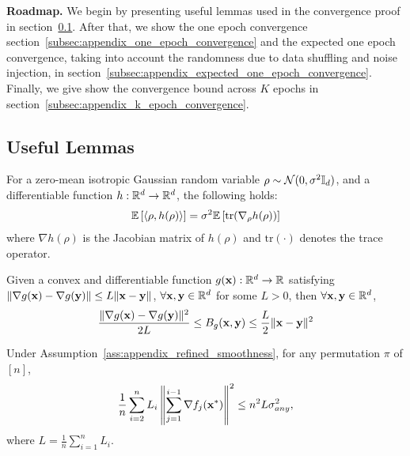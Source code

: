 \textbf{Roadmap.} We begin by presenting useful lemmas used in the convergence proof in section~\ref{subsec:appendix_useful_lemmas}.
After that, we show the one epoch convergence section~\ref{subsec:appendix_one_epoch_convergence} and the expected one epoch convergence, taking into account the randomness due to data shuffling and noise injection, in section~\ref{subsec:appendix_expected_one_epoch_convergence}.
Finally, we give show the convergence bound across $K$ epochs in section~\ref{subsec:appendix_k_epoch_convergence}.

\subsection{Useful Lemmas}
\label{subsec:appendix_useful_lemmas}

\begin{lemma}
\label{lemma:steins_lemma}
    For a zero-mean isotropic Gaussian random variable $\rho \sim {\mathcal{N}}(0, \sigma^2{\mathbb{I}}_d)$, and a differentiable function $h: \mathbb{R}^{d} \rightarrow \mathbb{R}^d$, the following holds:
    \begin{align*}
        \mathbb{E}\left[ \langle \rho, h(\rho) \rangle \right]
        = \sigma^2 \mathbb{E}\left[\text{tr}(\nabla_{\rho} h(\rho))\right]
    \end{align*}
    where $\nabla h(\rho)$ is the Jacobian matrix of $h(\rho)$ and $\text{tr}(\cdot)$ denotes the trace operator.
\end{lemma}


\begin{lemma}
\label{lemma:breg_div_ub_lb}
    Given a convex and differentiable function $g({\mathbf{x}}): \mathbb{R}^d \rightarrow \mathbb{R}$ satisfying 
    $\| \nabla g({\mathbf{x}}) - \nabla g({\mathbf{y}}) \| \leq L \|{\mathbf{x}} - {\mathbf{y}}\|$, $\forall {\mathbf{x}}, {\mathbf{y}} \in \mathbb{R}^d$ for some $L > 0$, then $\forall {\mathbf{x}}, {\mathbf{y}} \in \mathbb{R}^d$,
    \begin{align*}
        \frac{\| \nabla g({\mathbf{x}}) - \nabla g({\mathbf{y}}) \|^2}{2 L} \leq B_g({\mathbf{x}}, {\mathbf{y}}) \leq \frac{L}{2}\|{\mathbf{x}} - {\mathbf{y}}\|^2
    \end{align*}
\end{lemma}

\begin{lemma}
\label{lemma:opt_noise_bound}
    Under Assumption~\ref{ass:appendix_refined_smoothness}, for any permutation $\pi$ of $[n]$,
    \begin{align*}
        \frac{1}{n}\sum_{i=2}^{n} L_i \left\| \sum_{j=1}^{i-1} \nabla f_j({\mathbf{x}}^*) \right\|^2 \leq n^2 L \sigma_{any}^2,
    \end{align*}
    where $L = \frac{1}{n}\sum_{i=1}^{n} L_i$. 
\end{lemma}


